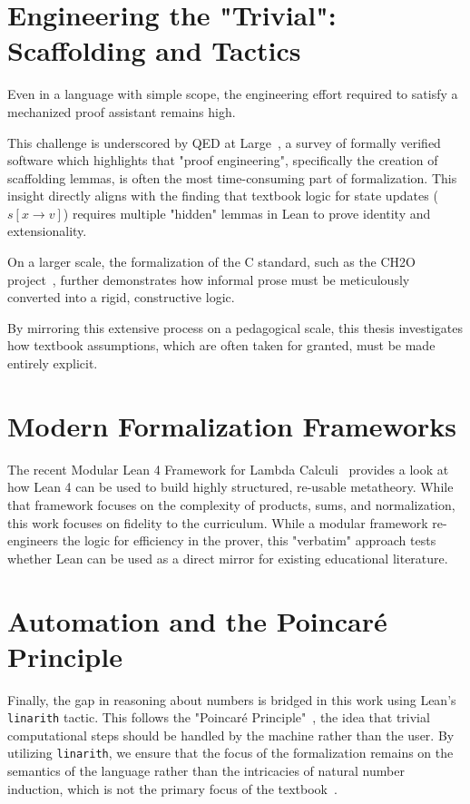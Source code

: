 %
%
%
\section{Engineering the "Trivial": Scaffolding and Tactics}
Even in a language with simple scope,
the engineering effort required to satisfy a mechanized
proof assistant remains high.

This challenge is underscored by QED at Large~\citep{ringer_qed_2019},
a survey of formally verified software which highlights that
"proof engineering", specifically the creation of scaffolding
lemmas, is often the most time-consuming part of formalization.
This insight directly aligns with the finding that textbook logic
for state updates ($s[x \to v]$) requires multiple "hidden"
lemmas in Lean to prove identity and extensionality.

On a larger scale, the formalization of the C standard,
such as the CH2O project~\citep{mechanizedCSpecification},
further demonstrates how informal prose must be meticulously
converted into a rigid, constructive logic.

By mirroring this extensive process on a pedagogical scale,
this thesis investigates how textbook assumptions,
which are often taken for granted, must be made entirely explicit.

%
%
%
\section{Modern Formalization Frameworks}
The recent Modular Lean 4 Framework for Lambda
Calculi~\citep{ramos2025modularLean4framework} provides a look at how Lean 4 can be used to build highly structured,
re-usable metatheory. While that framework focuses on the complexity of products,
sums, and normalization, this work focuses on fidelity to the curriculum. While a
modular framework re-engineers the logic for efficiency in the prover, this "verbatim"
approach tests whether Lean can be used as a direct mirror for existing educational
literature.

%
%
%
\section{Automation and the Poincaré Principle}
Finally, the gap in reasoning
about numbers is bridged in this work using Lean's \texttt{linarith} tactic.
This follows the "Poincaré Principle"~\citep{barendregt_autarkic_2002}, the idea that trivial computational steps
should be handled by the machine rather than the user. By utilizing \texttt{linarith},
we ensure that the focus of the formalization remains on the semantics of the
language rather than the intricacies of natural number induction, which is not
the primary focus of the textbook~\citep{nielson_semantics_2007}.